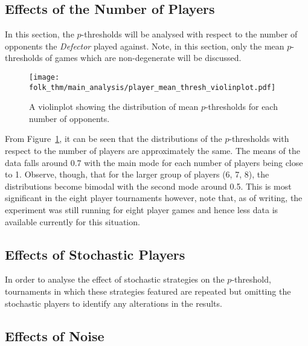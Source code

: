 \subsection{Effects of the Number of Players}\label{subsec:Effects_of_the_number_of_Players}
In this section, the \(p\)-thresholds will be analysed with respect to the
number of opponents the \textit{Defector} played against. Note, in this section,
only the mean \(p\)-thresholds of games which are non-degenerate will be discussed. 


\begin{figure}
    \centering
    \texttt{[image: folk\_thm/main\_analysis/player\_mean\_thresh\_violinplot.pdf]}
    \caption{A violinplot showing the distribution of mean \(p\)-thresholds for each number of opponents.}\label{fig:player_mean_thresh_violinplot}
\end{figure}

From Figure~\ref{fig:player_mean_thresh_violinplot}, it can be seen that the
distributions of the \(p\)-thresholds with respect to the number of players are
approximately the same. The means of the data falls around 0.7 with the main
mode for each number of players being close to 1. Observe, though, that for the
larger group of players (6, 7, 8), the distributions become bimodal with the
second mode around 0.5. This is most significant in the eight player tournaments
however, note that, as of writing, the experiment was still running for eight
player games and hence less data is available currently for this situation.


\subsection{Effects of Stochastic Players}\label{subsec:Effects_of_Stochastic_Players}

In order to analyse the effect of stochastic strategies on the \(p\)-threshold,
tournaments in which these strategies featured are repeated but omitting the
stochastic players to identify any alterations in the results. 




\subsection{Effects of Noise}\label{subsec:Effects_of_Noise}



